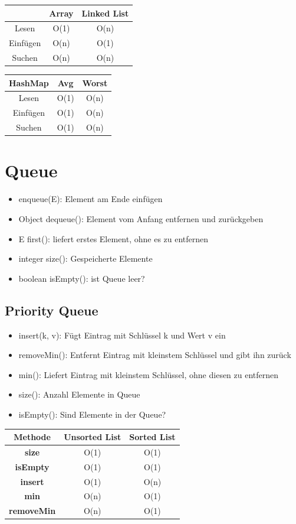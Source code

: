 \begin{multicols*}{4}
		\begin{tabular}{c | c | c}
			& Array & Linked List \\
			\hline
			Lesen & O(1) & O(n) \\
			Einfügen & O(n) & O(1)  \\
			Suchen & O(n) & O(n) \\
		\end{tabular}
	
		\begin{tabular}{c | c | c}
			\textbf{HashMap} & Avg & Worst \\
			\hline
			Lesen & O(1) & O(n) \\
			Einfügen & O(1) & O(n)  \\
			Suchen & O(1) & O(n) \\
		\end{tabular}

\section{Queue}
	\begin{itemize}
		\item enqueue(E): Element am Ende einfügen
		\item Object dequeue(): Element vom Anfang entfernen und
		zurückgeben
		\item E first(): liefert erstes Element, ohne es zu entfernen
		\item integer size(): Gespeicherte Elemente
		\item boolean isEmpty(): ist Queue leer?
	\end{itemize}

	\subsection{Priority Queue}
		\begin{itemize}
			\item insert(k, v): Fügt Eintrag mit Schlüssel k und Wert v ein
			\item removeMin(): Entfernt Eintrag mit kleinstem Schlüssel und gibt ihn zurück
			\item min(): Liefert Eintrag mit kleinstem Schlüssel, ohne diesen zu entfernen
			\item size(): Anzahl Elemente in Queue
			\item isEmpty(): Sind Elemente in der Queue?
		\end{itemize}
		
		\begin{tabular}{c | c | c}
			\textbf{Methode} & \textbf{Unsorted List} & \textbf{Sorted List} \\
			\hline
			\textbf{size} & O(1) & O(1) \\
			\textbf{isEmpty} & O(1) & O(1) \\
			\textbf{insert} & O(1) & O(n) \\
			\textbf{min} & O(n) & O(1) \\
			\textbf{removeMin} & O(n) & O(1) \\
		\end{tabular}
	

\end{multicols*}
